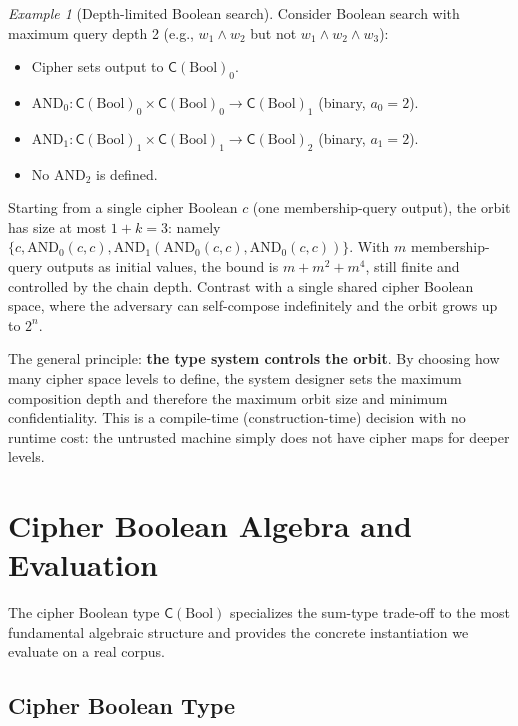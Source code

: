 \documentclass[11pt]{article}
\theoremstyle{definition}
\theoremstyle{plain}
\theoremstyle{remark}
\newtheorem{example}{Example}[section]
\newcommand{\cipher}[1]{\mathsf{C}(#1)}
\begin{document}
\begin{example}[Depth-limited Boolean search]
\label{ex:typed-bool}
Consider Boolean search with maximum query depth 2 (e.g., $w_1 \land w_2$
but not $w_1 \land w_2 \land w_3$):
\begin{itemize}
\item Cipher sets output to $\cipher{\mathrm{Bool}}_0$.
\item $\mathrm{AND}_0 : \cipher{\mathrm{Bool}}_0 \times
  \cipher{\mathrm{Bool}}_0 \to \cipher{\mathrm{Bool}}_1$
  (binary, $a_0 = 2$).
\item $\mathrm{AND}_1 : \cipher{\mathrm{Bool}}_1 \times
  \cipher{\mathrm{Bool}}_1 \to \cipher{\mathrm{Bool}}_2$
  (binary, $a_1 = 2$).
\item No $\mathrm{AND}_2$ is defined.
\end{itemize}
Starting from a single cipher Boolean $c$ (one membership-query
output), the orbit has size at most $1 + k = 3$: namely
$\{c, \mathrm{AND}_0(c, c), \mathrm{AND}_1(\mathrm{AND}_0(c, c),
\mathrm{AND}_0(c, c))\}$.
With $m$ membership-query outputs as initial values, the bound is
$m + m^2 + m^4$, still finite and controlled by the chain depth.
Contrast with a single shared cipher Boolean space, where the
adversary can self-compose indefinitely and the orbit grows up to
$2^n$.
\end{example}

The general principle: \textbf{the type system controls the orbit}.
By choosing how many cipher space levels to define, the system designer
sets the maximum composition depth and therefore the maximum orbit size
and minimum confidentiality.
This is a compile-time (construction-time) decision with no runtime
cost: the untrusted machine simply does not have cipher maps for
deeper levels.


\section{Cipher Boolean Algebra and Evaluation}
\label{sec:cipher-bool}

The cipher Boolean type $\cipher{\mathrm{Bool}}$ specializes the
sum-type trade-off to the most fundamental algebraic structure and
provides the concrete instantiation we evaluate on a real corpus.


\subsection{Cipher Boolean Type}
\label{sec:cipher-bool-type}
\end{document}

